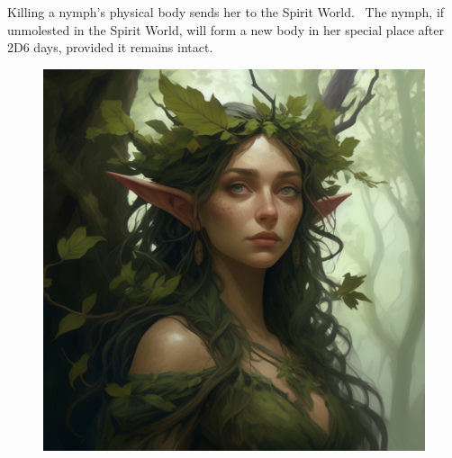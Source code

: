 Killing a nymph’s physical body sends her to the Spirit World.  The nymph, if unmolested in the Spirit World, will form a new body in her special place after 2D6 days, provided it remains intact.


\begin{figure}[h]
\begin{center}
\includegraphics[scale=0.24]{img/ai-images/dryad.png}
\end{center}
\end{figure}
